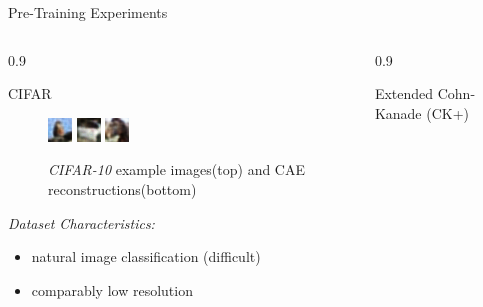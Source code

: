 \documentclass[final]{beamer}
\newlength{\onecolwid}
\newlength{\threecolwid}
\begin{document}
\begin{frame}[t]
\begin{columns}[t]
\begin{column}{\threecolwid}
\begin{alertblock}{Pre-Training Experiments}
\begin{columns}[t, totalwidth=0.9\threecolwid]
\begin{column}{0.9\onecolwid}
\begin{block}{CIFAR}
\begin{figure}
	\includegraphics[width=0.2\linewidth]{graphics/reconstructions/cifar/reconstruction_00.png}
	\includegraphics[width=0.2\linewidth]{graphics/reconstructions/cifar/reconstruction_01.png}
	\includegraphics[width=0.2\linewidth]{graphics/reconstructions/cifar/reconstruction_02.png}

	\caption{\emph{CIFAR-10} example images(top) and CAE reconstructions(bottom)}

	\end{figure}

	\emph{Dataset Characteristics:}\\
	\begin{itemize}
	\item natural image classification (difficult)
	\item comparably low resolution
	\end{itemize}
	\end{block}
	\end{column}

	\begin{column}{0.9\onecolwid}
	\begin{block}{Extended Cohn-Kanade (CK+)}


\end{block}
\end{column}
\end{columns}
\end{alertblock}
\end{column}
\end{columns}
\end{frame}
\end{document}
